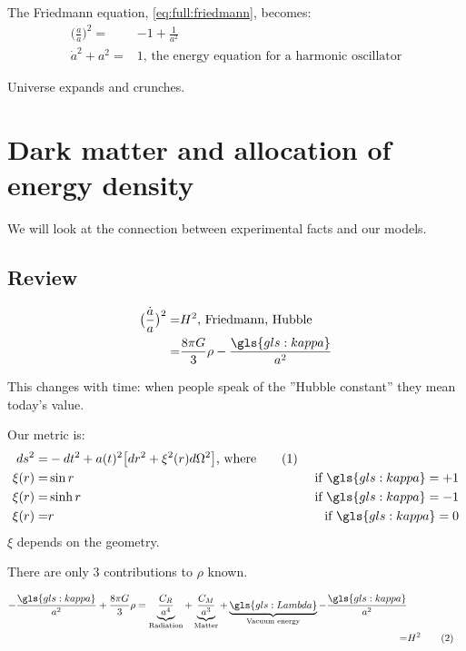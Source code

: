 \documentclass[]{article}
\newcommand\numberthis{\addtocounter{equation}{1}\tag{\theequation}}
\begin{document}
 The Friedmann equation, \eqref{eq:full:friedmann}, becomes:
 \begin{align*}
 	\big(\frac{\dot{a}}{a}\big)^2  =& -1 + \frac{1}{a^2} \\
 	\dot{a}^2 + a^2 =&1 \text{, the energy equation for a harmonic oscillator}
 \end{align*}
 
 Universe expands and crunches.
 


\section{Dark matter and allocation of energy density}

We will look at the connection between experimental facts and our models.

\subsection{Review}
\begin{align*}
	\big(\frac{\dot{a}}{a}\big)^2 =& H^2 \text{, Friedmann, Hubble}\\
	=& \frac{8\pi G}{3} \rho - \frac{\gls{gls:kappa}}{a^2}
\end{align*}

This changes with time: when people speak of the ''Hubble constant'' they mean today's value.

Our metric is:
\begin{align*}
	ds^2 =& - dt^2 +a(t)^2\big[dr^2 + \xi^2(r) d\Omega^2\big] \text{, where} \numberthis \label{fig:metric:6}\\
	\xi(r)=&\sin{r}& \text{ if } \gls{gls:kappa} = +1\\
	\xi(r)=&\sinh{r}& \text{ if }\gls{gls:kappa} = -1\\
	\xi(r)=&r& \text{ if } \gls{gls:kappa} = 0
\end{align*} $\xi$ depends on the geometry.

There are only 3 contributions to $\rho$ known.

\begin{align*}
	- \frac{\gls{gls:kappa}}{a^2} + \frac{8 \pi G}{3}\rho = \underbrace{\frac{C_R}{a^4}}_\text{Radiation} + \underbrace{\frac{C_M}{a^3}}_\text{Matter}+ \underbrace{\gls{gls:Lambda}}_\text{Vacuum energy} - \frac{\gls{gls:kappa}}{a^2}\\
	=&H^2 \numberthis \label{eq:hubble:contraint}
\end{align*}
\end{document}
